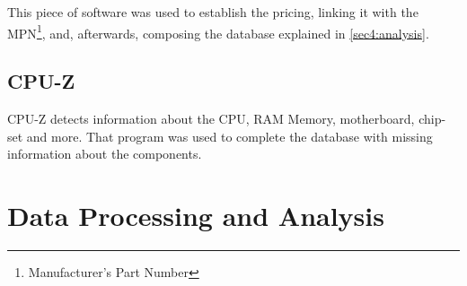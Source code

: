     This piece of software was used to establish the pricing, linking it with the MPN\footnote{Manufacturer's Part Number}, and, afterwards, composing the database explained in \ref{sec4:analysis}. 
    
    \subsection{CPU-Z} \label{sec3:cpu-z}
    CPU-Z detects information about the CPU, RAM Memory, motherboard, chip-set and more. That program was used to complete the database with missing information about the components.

\section{Data Processing and Analysis} \label{sec3:data_processing_analysis}
